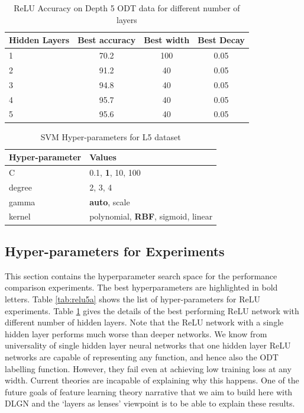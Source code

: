 \documentclass{article}
\theoremstyle{plain}
\theoremstyle{definition}
\theoremstyle{remark}
\newcommand{\1}{{\mathbf 1}}
\newcommand{\0}{{\mathbf 0}}
\renewcommand{\>}{{\rightarrow}}
\begin{document}
\begin{table}[h]
    \centering
    \caption{ReLU Accuracy on Depth 5 ODT data for different number of layers}    
    \begin{tabular}{|l|c|c|c|}
    \hline
    Hidden Layers & Best accuracy & Best width & Best Decay  \\     \hline
    1 & 70.2 & 100 & 0.05 \\     \hline
    2 & 91.2 & 40 & 0.05 \\         \hline
    3 & 94.8 & 40 & 0.05 \\     \hline
    4 & 95.7 & 40 & 0.05 \\    \hline        
    5 & 95.6 & 40 & 0.05  \\     \hline
    \end{tabular}
    \label{tab:relu5a_details}
\end{table}

\begin{table}[h]
\centering
\caption{SVM Hyper-parameters for L5 dataset}
\begin{tabular}{|l|l|}
\hline
\textbf{Hyper-parameter} & \textbf{Values} \\ \hline
C & 0.1, \textbf{1}, 10, 100 \\ 
degree & 2, 3, 4 \\ 
gamma & \textbf{auto}, scale \\ 
kernel & polynomial, \textbf{RBF}, sigmoid, linear \\ \hline
\end{tabular}
\label{tab:svm5a}
\end{table}

\newpage
\subsection{Hyper-parameters for Experiments}

This section contains the hyperparameter search space for the performance comparison experiments. The best hyperparameters are highlighted in bold letters. Table \ref{tab:relu5a} shows the list of hyper-parameters for ReLU experiments. Table \ref{tab:relu5a_details} gives the details of the best performing ReLU network with different number of hidden layers. Note that the ReLU network with a single hidden layer performs much worse than deeper networks. We know from universality of single hidden layer neural networks that one hidden layer ReLU networks are capable of representing any function, and hence also the ODT labelling function. However, they fail even at achieving low training loss at any width. Current theories are incapable of explaining why this happens. One of the future goals of feature learning theory narrative that we aim to build here with DLGN and the `layers as lenses' viewpoint is to be able to explain these results. 
\end{document}
